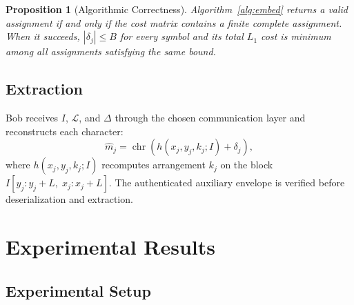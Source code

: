 \documentclass[preprint,12pt]{elsarticle}
\theoremstyle{plain}
\newtheorem{proposition}{Proposition}
\begin{document}
\begin{proposition}[Algorithmic Correctness]
Algorithm~\ref{alg:embed} returns a valid assignment if and only if the cost
matrix contains a finite complete assignment. When it succeeds,
$|\delta_j|\leq B$ for every symbol and its total $L_1$ cost is minimum among
all assignments satisfying the same bound.
\end{proposition}

\subsection{Extraction}

Bob receives $I$, $\mathcal{L}$, and $\Delta$ through the chosen communication
layer and reconstructs each character:
\begin{equation}
    \hat{m}_j = \operatorname{chr}\!\left(
    h(x_j,y_j,k_j;I)+\delta_j\right),
\end{equation}
where $h(x_j,y_j,k_j;I)$ recomputes arrangement $k_j$ on the block
$I[y_j:y_j+L,\;x_j:x_j+L]$. The authenticated auxiliary envelope is verified
before deserialization and extraction.

\section{Experimental Results}
\label{sec:experiments}

\subsection{Experimental Setup}
\end{document}
